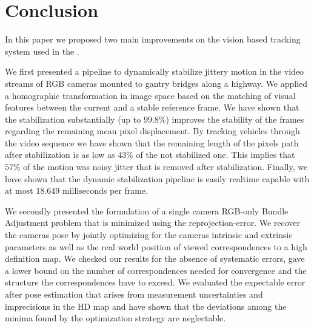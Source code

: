 
\section{Conclusion}

In this paper we proposed two main improvements on the vision based tracking system used in the \Providentia{}.

We first presented a pipeline to dynamically stabilize jittery motion in the video streams of RGB cameras mounted to gantry bridges along a highway.
We applied a homographic transformation in image space based on the matching of visual features between the current and a stable reference frame.
We have shown that the stabilization substantially (up to $99.8\%$) improves the stability of the frames regarding the remaining mean pixel displacement.
By tracking vehicles through the video sequence we have shown that the remaining length of the pixels path after stabilization is as low as $43\%$ of the not stabilized one.
This implies that $57\%$ of the motion was noisy jitter that is removed after stabilization.
Finally, we have shown that the dynamic stabilization pipeline is easily realtime capable with at most $18.649$ milliseconds per frame.

We secondly presented the formulation of a single camera RGB-only Bundle Adjustment problem that is minimized using the reprojection-error.
We recover the cameras pose by jointly optimizing for the cameras intrinsic and extrinsic parameters as well as the real world position of viewed correspondences to a high definition map.
We checked our results for the absence of systematic errors, gave a lower bound on the number of correspondences needed for convergence and the structure the correspondences have to exceed.
We evaluated the expectable error after pose estimation that arises from measurement uncertainties and imprecisions in the HD map and have shown that the deviations among the minima found by the optimization strategy are neglectable.
